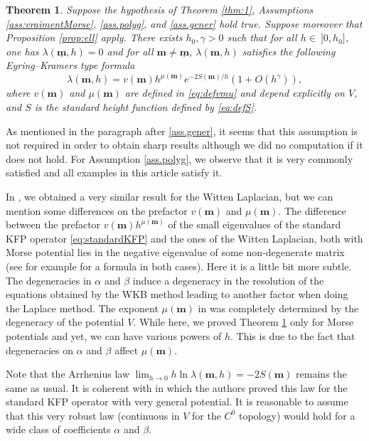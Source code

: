 \documentclass[12pt]{amsart}
\numberwithin{equation}{section}
\numberwithin{figure}{section}
\def\m{\mathbf{m}}
\def\um{\underline{\m}}
\newtheorem{theorem}{Theorem}
\begin{document}
\begin{theorem}\label{thm:2}
    Suppose the hypothesis of Theorem \ref{thm:1}, Assumptions \ref{ass:vraimentMorse}, \ref{ass.polyg}, and \eqref{ass.gener} hold true. Suppose moreover that Proposition \ref{prop:ell} apply. There exists $h_0,\gamma > 0$ such that for all $h\in\ ]0,h_0]$, one has $\lambda(\um,h) = 0$ and for all $\m\neq\um$, $\lambda(\m,h)$ satisfies the following Eyring–Kramers type formula
    \begin{equation*}
    \lambda(\m,h) = v(\m)h^{\mu(\m)}e^{-2S(\m)/h}(1+O(h^\gamma)),
    \end{equation*}
    where $v(\m)$ and $\mu(\m)$ are defined in \eqref{eq:defvmu} and depend explicitly on $V$, and $S$ is the standard height function defined by \eqref{eq:defS}.
\end{theorem}

As mentioned in the paragraph after \eqref{ass.gener}, it seems that this assumption is not required in order to obtain sharp results although we did no computation if it does not hold. For Assumption \ref{ass.polyg}, we observe that it is very commonly satisfied and all examples in this article satisfy it.

In \cite{De25_1}, we obtained a very similar result for the Witten Laplacian, but we can mention some differences on the prefactor $v(\m)$ and $\mu(\m)$. The difference between the prefactor $v(\m)h^{\mu(\m)}$ of the small eigenvalues of the standard KFP operator \eqref{eq:standardKFP} and the ones of the Witten Laplacian, both with Morse potential lies in the negative eigenvalue of some non-degenerate matrix (see for example \cite{BoLePMi22} for a formula in both cases). Here it is a little bit more subtle. The degeneracies in $\alpha$ and $\beta$ induce a degeneracy in the resolution of the equations obtained by the WKB method leading to another factor when doing the Laplace method. The exponent $\mu(\m)$ in \cite{De25_1} was completely determined by the degeneracy of the potential $V$. While here, we proved Theorem \ref{thm:2} only for Morse potentials and yet, we can have various powers of $h$. This is due to the fact that degeneracies on $\alpha$ and $\beta$ affect $\mu(\m)$.

Note that the Arrhenius law $\lim_{h\to0}h\ln\lambda(\m,h) = -2S(\m)$ remains the same as usual. It is coherent with \cite[Corollary 1.2.4]{NiSaWh24} in which the authors proved this law for the standard KFP operator with very general potential. It is reasonable to assume that this very robust law (continuous in $V$ for the $C^0$ topology) would hold for a wide class of coefficients $\alpha$ and $\beta$.
\end{document}
